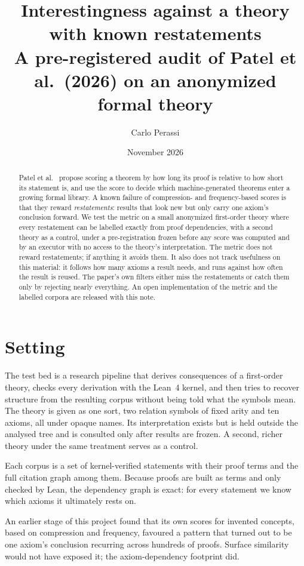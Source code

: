 \documentclass[11pt,a4paper]{article}
\title{Interestingness against a theory with known restatements\\[2pt]
\large A pre-registered audit of Patel et al.\ (2026) on an anonymized formal theory}
\author{Carlo Perassi}
\date{November 2026}
\begin{document}
\maketitle

\begin{abstract}
\noindent
Patel et al.~\cite{patel} propose scoring a theorem by how long its proof is relative to how
short its statement is, and use the score to decide which machine-generated
theorems enter a growing formal library. A known failure of compression- and
frequency-based scores is that they reward \emph{restatements}: results that
look new but only carry one axiom's conclusion forward. We test the metric on a
small anonymized first-order theory where every restatement can be labelled
exactly from proof dependencies, with a second theory as a control, under a
pre-registration frozen before any score was computed and by an executor with
no access to the theory's interpretation. The metric does not reward
restatements; if anything it avoids them. It also does not track usefulness on
this material: it follows how many axioms a result needs, and runs against how
often the result is reused. The paper's own filters either miss the
restatements or catch them only by rejecting nearly everything. An open
implementation of the metric and the labelled corpora are released with this
note.
\end{abstract}

\section{Setting}

The test bed is a research pipeline that derives consequences of a first-order
theory, checks every derivation with the Lean~4 kernel, and then tries to
recover structure from the resulting corpus without being told what the
symbols mean. The theory is given as one sort, two relation symbols of fixed
arity and ten axioms, all under opaque names. Its interpretation exists but is
held outside the analysed tree and is consulted only after results are frozen.
A second, richer theory under the same treatment serves as a control.

Each corpus is a set of kernel-verified statements with their proof terms and
the full citation graph among them. Because proofs are built as terms and
only checked by Lean, the dependency graph is exact: for every statement we know
which axioms it ultimately rests on.

An earlier stage of this project found that its own scores for invented
concepts, based on compression and frequency, favoured a pattern that turned
out to be one axiom's conclusion recurring across hundreds of proofs. Surface
similarity would not have exposed it; the axiom-dependency footprint did.
\end{document}
